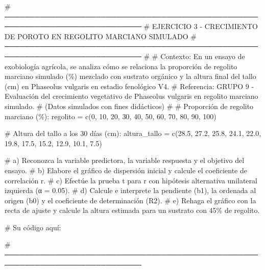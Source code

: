 \documentclass[
  spanish,
  letterpaper,
  DIV=11,
  numbers=noendperiod]{scrreprt}
\newenvironment{Shaded}{\begin{snugshade}}{\end{snugshade}}
\newcommand{\CommentTok}[1]{\textcolor[rgb]{0.37,0.37,0.37}{#1}}
\newcommand{\DecValTok}[1]{\textcolor[rgb]{0.68,0.00,0.00}{#1}}
\newcommand{\FloatTok}[1]{\textcolor[rgb]{0.68,0.00,0.00}{#1}}
\newcommand{\FunctionTok}[1]{\textcolor[rgb]{0.28,0.35,0.67}{#1}}
\newcommand{\NormalTok}[1]{\textcolor[rgb]{0.00,0.23,0.31}{#1}}
\newcommand{\OtherTok}[1]{\textcolor[rgb]{0.00,0.23,0.31}{#1}}
\begin{document}
\begin{Shaded}
\begin{Highlighting}[]
\CommentTok{\# ─────────────────────────────────────────────────────────────────────────────}
\CommentTok{\# EJERCICIO 3 {-} CRECIMIENTO DE POROTO EN REGOLITO MARCIANO SIMULADO}
\CommentTok{\# ─────────────────────────────────────────────────────────────────────────────}
\CommentTok{\#}
\CommentTok{\# Contexto: En un ensayo de exobiología agrícola, se analiza cómo se relaciona la proporción de regolito marciano simulado (\%) mezclado con sustrato orgánico y la altura final del tallo (cm) en Phaseolus vulgaris en estadio fenológico V4.}
\CommentTok{\# Referencia: GRUPO 9 {-} Evaluación del crecimiento vegetativo de Phaseolus vulgaris en regolito marciano simulado.}
\CommentTok{\# (Datos simulados con fines didácticos)}
\CommentTok{\#}
\CommentTok{\# Proporción de regolito marciano (\%):}
\NormalTok{regolito }\OtherTok{=} \FunctionTok{c}\NormalTok{(}\DecValTok{0}\NormalTok{, }\DecValTok{10}\NormalTok{, }\DecValTok{20}\NormalTok{, }\DecValTok{30}\NormalTok{, }\DecValTok{40}\NormalTok{, }\DecValTok{50}\NormalTok{, }\DecValTok{60}\NormalTok{, }\DecValTok{70}\NormalTok{, }\DecValTok{80}\NormalTok{, }\DecValTok{90}\NormalTok{, }\DecValTok{100}\NormalTok{)}

\CommentTok{\# Altura del tallo a los 30 días (cm):}
\NormalTok{altura\_tallo }\OtherTok{=} \FunctionTok{c}\NormalTok{(}\FloatTok{28.5}\NormalTok{, }\FloatTok{27.2}\NormalTok{, }\FloatTok{25.8}\NormalTok{, }\FloatTok{24.1}\NormalTok{, }\FloatTok{22.0}\NormalTok{, }\FloatTok{19.8}\NormalTok{, }\FloatTok{17.5}\NormalTok{, }\FloatTok{15.2}\NormalTok{, }\FloatTok{12.9}\NormalTok{, }\FloatTok{10.1}\NormalTok{, }\FloatTok{7.5}\NormalTok{)}

\CommentTok{\# a) Reconozca la variable predictora, la variable respuesta y el objetivo del ensayo.}
\CommentTok{\# b) Elabore el gráfico de dispersión inicial y calcule el coeficiente de correlación r.}
\CommentTok{\# c) Efectúe la prueba t para r con hipótesis alternativa unilateral izquierda (α = 0.05).}
\CommentTok{\# d) Calcule e interprete la pendiente (b1), la ordenada al origen (b0) y el coeficiente de determinación (R2).}
\CommentTok{\# e) Rehaga el gráfico con la recta de ajuste y calcule la altura estimada para un sustrato con 45\% de regolito.}

\CommentTok{\# Su código aquí:}

\CommentTok{\# ─────────────────────────────────────────────────────────────────────────────}



\end{Highlighting}
\end{Shaded}
\end{document}
